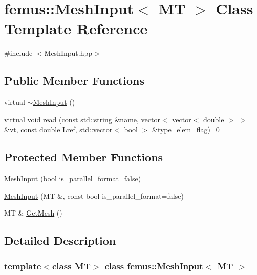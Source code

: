 \hypertarget{classfemus_1_1_mesh_input}{}\section{femus\+:\+:Mesh\+Input$<$ MT $>$ Class Template Reference}
\label{classfemus_1_1_mesh_input}


{\ttfamily \#include $<$Mesh\+Input.\+hpp$>$}

\subsection*{Public Member Functions}
\begin{DoxyCompactItemize}
\item 
virtual \mbox{\hyperlink{classfemus_1_1_mesh_input_ad030535230e78c4a3e2b4bfd750d7a1a}{$\sim$\+Mesh\+Input}} ()
\item 
virtual void \mbox{\hyperlink{classfemus_1_1_mesh_input_abf3b91c5ef2cdcf99561ab7429101601}{read}} (const std\+::string \&name, vector$<$ vector$<$ double $>$ $>$ \&vt, const double Lref, std\+::vector$<$ bool $>$ \&type\+\_\+elem\+\_\+flag)=0
\end{DoxyCompactItemize}
\subsection*{Protected Member Functions}
\begin{DoxyCompactItemize}
\item 
\mbox{\hyperlink{classfemus_1_1_mesh_input_a06a1295a7998ff9a5ebb2ee64d232db9}{Mesh\+Input}} (bool is\+\_\+parallel\+\_\+format=false)
\item 
\mbox{\hyperlink{classfemus_1_1_mesh_input_a774f8159ef1e7721f92ff001034e9775}{Mesh\+Input}} (MT \&, const bool is\+\_\+parallel\+\_\+format=false)
\item 
MT \& \mbox{\hyperlink{classfemus_1_1_mesh_input_a51922fa488be9d1c647026714ce25bdb}{Get\+Mesh}} ()
\end{DoxyCompactItemize}


\subsection{Detailed Description}
\subsubsection*{template$<$class MT$>$\newline
class femus\+::\+Mesh\+Input$<$ M\+T $>$}

